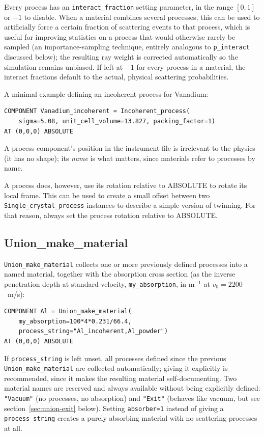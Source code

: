 Every process has an \texttt{interact\_fraction} setting parameter, in the
range $[0,1]$ or $-1$ to disable. When a material combines several
processes, this can be used to artificially force a certain fraction of
scattering events to that process, which is useful for improving statistics
on a process that would otherwise rarely be sampled (an importance-sampling
technique, entirely analogous to \texttt{p\_interact} discussed below); the
resulting ray weight is corrected automatically so the simulation remains
unbiased. If left at $-1$ for every process in a material, the interact
fractions default to the actual, physical scattering probabilities.

A minimal example defining an incoherent process for Vanadium:
\begin{lstlisting}
COMPONENT Vanadium_incoherent = Incoherent_process(
    sigma=5.08, unit_cell_volume=13.827, packing_factor=1)
AT (0,0,0) ABSOLUTE
\end{lstlisting}
A process component's position in the instrument file is irrelevant to the
physics (it has no shape); its \emph{name} is what matters, since materials
refer to processes by name.

A process does, however, use its rotation relative to ABSOLUTE to rotate
its local frame. This can be used to create a small offset between two
\texttt{Single\_crystal\_process} instances to describe a simple version
of twinning. For that reason, always set the process rotation relative to
ABSOLUTE.


\subsection{Union\_make\_material}
\label{sec:union-materials}

\texttt{Union\_make\_material} collects one or more previously defined
processes into a named material, together with the absorption cross section
(as the inverse penetration depth at standard velocity, \texttt{my\_absorption},
in m$^{-1}$ at $v_0=2200$~m/s):
\begin{lstlisting}
COMPONENT Al = Union_make_material(
    my_absorption=100*4*0.231/66.4,
    process_string="Al_incoherent,Al_powder")
AT (0,0,0) ABSOLUTE
\end{lstlisting}
If \texttt{process\_string} is left unset, all processes defined since the
previous \texttt{Union\_make\_material} are collected automatically; giving
it explicitly is recommended, since it makes the resulting material
self-documenting. Two material names are reserved and always available
without being explicitly defined: \texttt{"Vacuum"} (no processes, no
absorption) and \texttt{"Exit"} (behaves like vacuum, but see
section~\ref{sec:union-exit} below). Setting \texttt{absorber=1} instead of
giving a \texttt{process\_string} creates a purely absorbing material with
no scattering processes at all.

